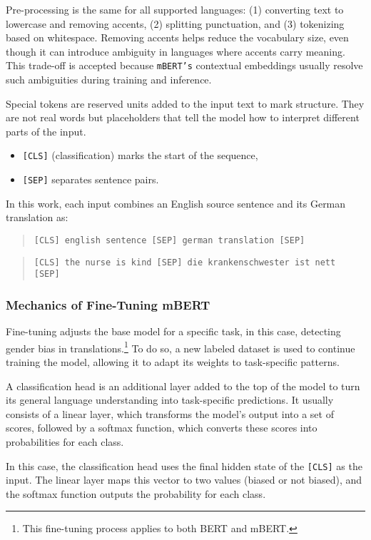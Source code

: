 Pre-processing is the same for all supported languages: (1) converting text to lowercase and removing accents, (2) splitting punctuation, and (3) tokenizing based on whitespace. Removing accents helps reduce the vocabulary size, even though it can introduce ambiguity in languages where accents carry meaning. This trade-off is accepted because \texttt{mBERT's} contextual embeddings usually resolve such ambiguities during training and inference.

Special tokens are reserved units added to the input text to mark structure. They are not real words but placeholders that tell the model how to interpret different parts of the input.

\begin{itemize}
	\item \texttt{[CLS]} (classification) marks the start of the sequence,
	\item \texttt{[SEP]} separates sentence pairs.
\end{itemize}

\noindent In this work, each input combines an English source sentence and its German translation as:

\begin{quote}
    \texttt{[CLS] english sentence [SEP] german translation [SEP]}
\end{quote}

\begin{quote}
\texttt{[CLS] the nurse is kind [SEP] die krankenschwester ist nett [SEP]}
\end{quote}

\subsubsection{Mechanics of Fine-Tuning mBERT}
    Fine-tuning adjusts the base model for a specific task, in this case, detecting gender bias in translations.\footnote{This fine-tuning process applies to both BERT and mBERT.} To do so, a new labeled dataset is used to continue training the model, allowing it to adapt its weights to task-specific patterns. 

    A classification head is an additional layer added to the top of the model to turn its general language understanding into task-specific predictions. It usually consists of a linear layer, which transforms the model’s output into a set of scores, followed by a softmax function, which converts these scores into probabilities for each class.

    In this case, the classification head uses the final hidden state of the \texttt{[CLS]} as the input. The linear layer maps this vector to two values (biased or not biased), and the softmax function outputs the probability for each class.

